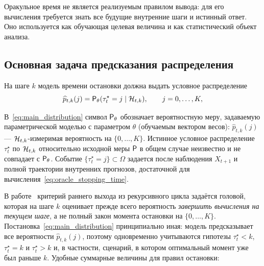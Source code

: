 Оракульное время не является реализуемым правилом вывода: для его вычисления требуется знать все
будущие внутренние шаги и истинный ответ. Оно используется как обучающая целевая величина и как
статистический объект анализа.

\subsection{Основная задача предсказания распределения}

На шаге \(k\) модель времени остановки должна выдать условное распределение
\begin{equation}
  \widehat p_{t,k}(j)=\mathsf{P}_\theta(\tau_t^\star=j\mid\mathcal{H}_{t,k}), \qquad j=0,\ldots,K,
  \label{eq:main_distribution}
\end{equation}

В~\eqref{eq:main_distribution} символ \(\mathsf{P}_\theta\) обозначает вероятностную меру, задаваемую
параметрической моделью с параметром \(\theta\) (обучаемым вектором весов): \(\widehat
p_{t,k}(j)\) --- \(\mathcal{H}_{t,k}\)-измеримая вероятность на \(\{0,\ldots,K\}\). Истинное условное
распределение \(\tau_t^\star\) по \(\mathcal{H}_{t,k}\) относительно исходной меры \(\mathsf{P}\) в общем
случае неизвестно и не совпадает с \(\mathsf{P}_\theta\). Событие \(\{\tau_t^\star=j\}\subset\Omega\)
задается после наблюдения \(X_{t+1}\) и полной траектории внутренних прогнозов, достаточной для
вычисления~\eqref{eq:oracle_stopping_time}.

В работе~\cite{trm} критерий раннего выхода из рекурсивного цикла задаётся головой, которая на
шаге \(k\) оценивает прежде всего вероятность \emph{завершить вычисления на текущем шаге}, а не
полный закон момента остановки на \(\{0,\ldots,K\}\). Постановка~\eqref{eq:main_distribution}
принципиально иная: модель предсказывает все вероятности \(\widehat p_{t,k}(j)\), поэтому
одновременно учитываются гипотезы \(\tau_t^\star<k\), \(\tau_t^\star=k\) и \(\tau_t^\star>k\) и, в
частности, сценарий, в котором оптимальный момент уже был раньше \(k\). Удобные суммарные
величины для правил остановки:

